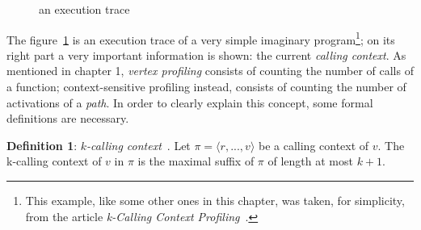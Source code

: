 \documentclass[a4paper,10pt]{report}
\begin{document}
\begin{figure}
\begin{center}


\caption{an execution trace}
\label{callex1}
\end{center}
\end{figure}
The figure~\ref{callex1} is an execution trace of a very simple imaginary program\footnote{This example, like some other ones in this chapter, was taken, for simplicity, from the article \emph{k-Calling Context Profiling}~\cite{kccf}.}; on its right part a very important information is shown: the current \emph{calling context}. 
As mentioned in chapter 1, \emph{vertex profiling} consists of counting the number of calls of a function; context-sensitive profiling instead, consists of counting the number of activations of a \emph{path}. In order to clearly explain this concept, some formal definitions are necessary.

\textbf{Definition 1}: \emph{$k$-calling context}~\cite{kccf}. 
Let $\pi = \langle r,...,v\rangle$ be a calling context of $v$. The k-calling context of $v$
in $\pi$ is the maximal suffix of $\pi$ of length at most $k+1$.
\end{document}
